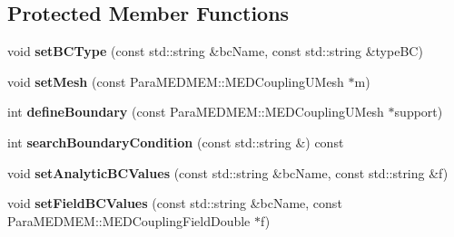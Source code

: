 \subsection*{Protected Member Functions}
\begin{DoxyCompactItemize}
\item 
\hypertarget{class_l_i_b_m_e_s_h_aae41ff7a833629b5cbcf67cff328a6b6}{void {\bfseries set\-B\-C\-Type} (const std\-::string \&bc\-Name, const std\-::string \&type\-B\-C)}\label{class_l_i_b_m_e_s_h_aae41ff7a833629b5cbcf67cff328a6b6}

\item 
\hypertarget{class_l_i_b_m_e_s_h_a84c031a0f038ed3d72d7fd8a27596913}{void {\bfseries set\-Mesh} (const Para\-M\-E\-D\-M\-E\-M\-::\-M\-E\-D\-Coupling\-U\-Mesh $\ast$m)}\label{class_l_i_b_m_e_s_h_a84c031a0f038ed3d72d7fd8a27596913}

\item 
\hypertarget{class_l_i_b_m_e_s_h_a0d034a75893e66fb1eefb97d3f696f71}{int {\bfseries define\-Boundary} (const Para\-M\-E\-D\-M\-E\-M\-::\-M\-E\-D\-Coupling\-U\-Mesh $\ast$support)}\label{class_l_i_b_m_e_s_h_a0d034a75893e66fb1eefb97d3f696f71}

\item 
\hypertarget{class_l_i_b_m_e_s_h_af9e3ba09f53d09b1047649b274a2b54a}{int {\bfseries search\-Boundary\-Condition} (const std\-::string \&) const }\label{class_l_i_b_m_e_s_h_af9e3ba09f53d09b1047649b274a2b54a}

\item 
\hypertarget{class_l_i_b_m_e_s_h_aceb23ee70e4758befd12fde103156dbc}{void {\bfseries set\-Analytic\-B\-C\-Values} (const std\-::string \&bc\-Name, const std\-::string \&f)}\label{class_l_i_b_m_e_s_h_aceb23ee70e4758befd12fde103156dbc}

\item 
\hypertarget{class_l_i_b_m_e_s_h_a53e8192426ef6ec098f4a0f966b0fe2c}{void {\bfseries set\-Field\-B\-C\-Values} (const std\-::string \&bc\-Name, const Para\-M\-E\-D\-M\-E\-M\-::\-M\-E\-D\-Coupling\-Field\-Double $\ast$f)}\label{class_l_i_b_m_e_s_h_a53e8192426ef6ec098f4a0f966b0fe2c}

\end{DoxyCompactItemize}
